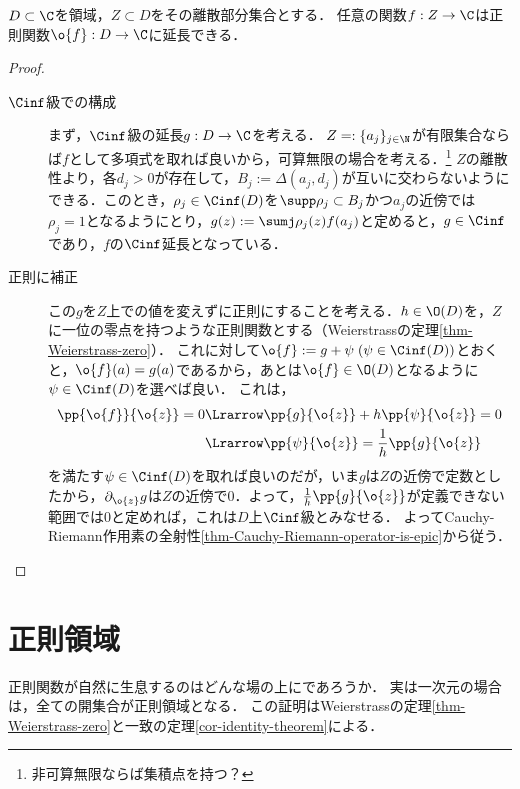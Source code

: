 \documentclass[uplatex, dvipdfmx]{jsreport}
\begin{document}
\begin{theorem}[補間定理]
    $D\subset\C$を領域，$Z\subset D$をその離散部分集合とする．
    任意の関数$f:Z\to\C$は正則関数$\o{f}:D\to\C$に延長できる．
\end{theorem}
\begin{proof}\mbox{}
    \begin{description}
        \item[$\Cinf$級での構成] まず，$\Cinf$級の延長$g:D\to\C$を考える．
        $Z=:\{a_j\}_{j\in\N}$が有限集合ならば$f$として多項式を取れば良いから，可算無限の場合を考える．\footnote{非可算無限ならば集積点を持つ？}
        $Z$の離散性より，各$d_j>0$が存在して，$B_j:=\Delta(a_j,d_j)$が互いに交わらないようにできる．このとき，$\rho_j\in\Cinf(D)$を$\supp\rho_j\subset B_j$かつ$a_j$の近傍では$\rho_j=1$となるようにとり，$g(z):=\sumj\rho_j(z)f(a_j)$と定めると，$g\in\Cinf$であり，$f$の$\Cinf$延長となっている．
        \item[正則に補正]
        この$g$を$Z$上での値を変えずに正則にすることを考える．$h\in\O(D)$を，$Z$に一位の零点を持つような正則関数とする（Weierstrassの定理\ref{thm-Weierstrass-zero}）．
        これに対して$\o{f}:=g+\psi\;(\psi\in\Cinf(D))$とおくと，$\o{f}(a)=g(a)$であるから，あとは$\o{f}\in\O(D)$となるように$\psi\in\Cinf(D)$を選べば良い．
        これは，
        \begin{align*}
            \pp{\o{f}}{\o{z}}=0&\Lrarrow\pp{g}{\o{z}}+h\pp{\psi}{\o{z}}=0\\
            &\Lrarrow\pp{\psi}{\o{z}}=\frac{1}{h}\pp{g}{\o{z}}
        \end{align*}
        を満たす$\psi\in\Cinf(D)$を取れば良いのだが，いま$g$は$Z$の近傍で定数としたから，$\partial_{\o{z}}g$は$Z$の近傍で$0$．よって，$\frac{1}{h}\pp{g}{\o{z}}$が定義できない範囲では$0$と定めれば，これは$D$上$\Cinf$級とみなせる．
        よってCauchy-Riemann作用素の全射性\ref{thm-Cauchy-Riemann-operator-is-epic}から従う．
    \end{description}
\end{proof}

\section{正則領域}

\begin{tcolorbox}[colframe=ForestGreen, colback=ForestGreen!10!white,breakable,colbacktitle=ForestGreen!40!white,coltitle=black,fonttitle=\bfseries\sffamily,
title=]
    正則関数が自然に生息するのはどんな場の上にであろうか．
    実は一次元の場合は，全ての開集合が正則領域となる．
    この証明はWeierstrassの定理\ref{thm-Weierstrass-zero}と一致の定理\ref{cor-identity-theorem}による．
\end{tcolorbox}
\end{document}
